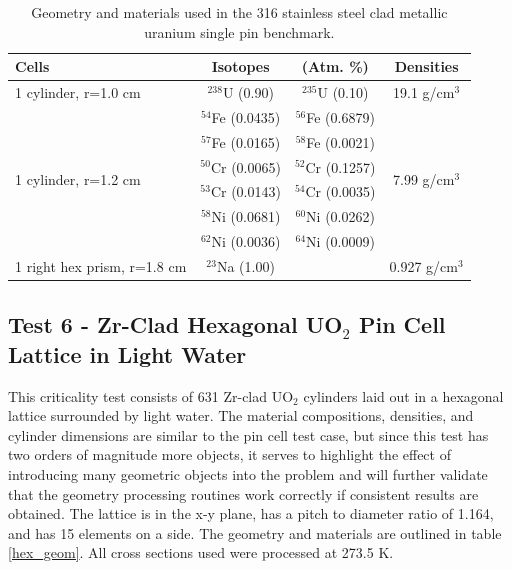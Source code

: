 \documentclass[preprint,12pt]{elsarticle}
\begin{document}
\begin{table}[h]
\centering
\caption{Geometry and materials used in the 316 stainless steel clad metallic uranium single pin benchmark.}
\label{sodium_geom}
\begin{tabular}{| l | c  c  | c |}
\hline
Cells & Isotopes & (Atm. \%)     & Densities \\
\hline
\multirow{1}{*}{1 cylinder, r=1.0 cm }   &  $^{238}$U   (0.90)   & $^{235}$U   (0.10)   &    \multirow{1}{*}{19.1 g/cm$^3$} \\
\hline
\multirow{6}{*}{1 cylinder, r=1.2 cm }   &  $^{54}$Fe  (0.0435) & $^{56}$Fe  (0.6879)  &   \multirow{6}{*}{7.99 g/cm$^3$} \\
                                         &  $^{57}$Fe  (0.0165) & $^{58}$Fe  (0.0021)  &   \\
                                         &  $^{50}$Cr  (0.0065) & $^{52}$Cr  (0.1257)  &   \\
                                         &  $^{53}$Cr  (0.0143) & $^{54}$Cr  (0.0035)  &   \\
                                         &  $^{58}$Ni  (0.0681) & $^{60}$Ni  (0.0262)  &   \\
                                         &  $^{62}$Ni  (0.0036) &  $^{64}$Ni  (0.0009) &   \\
\hline
1 right hex prism, r=1.8 cm              &  $^{23}$Na   (1.00)  &                      &    0.927 g/cm$^3$ \\
\hline
\end{tabular}
\end{table}


\subsection{Test 6 - Zr-Clad Hexagonal UO$_2$ Pin Cell Lattice in Light Water}

This criticality test consists of 631 Zr-clad UO$_2$ cylinders laid out in a hexagonal lattice surrounded by light water.  The material compositions, densities, and cylinder dimensions are similar to the pin cell test case, but since this test has two orders of magnitude more objects, it serves to highlight the effect of introducing many geometric objects into the problem and will further validate that the geometry processing routines work correctly if consistent results are obtained.  The lattice is in the x-y plane, has a pitch to diameter ratio of 1.164, and has 15 elements on a side.  The geometry and materials are outlined in table \ref{hex_geom}.  All cross sections used were processed at 273.5 K.
\end{document}
